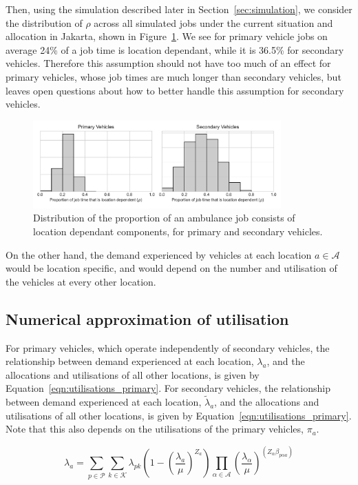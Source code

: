 \documentclass[preprint,12pt]{elsarticle}
\begin{document}
Then, using the simulation described later in Section~\ref{sec:simulation}, we
consider the distribution of $\rho$ across all simulated jobs under the current
situation and allocation in Jakarta, shown in Figure~\ref{fig:rho_distribution}.
We see for primary vehicle jobs on average 24\% of a job time is location
dependant, while it is 36.5\% for secondary vehicles. Therefore this assumption
should not have too much of an effect for primary vehicles, whose job times are
much longer than secondary vehicles, but leaves open questions about how to
better handle this assumption for secondary vehicles.

\begin{figure}
    \centering
    \includegraphics[width=0.85\textwidth]{img/location_dependant_service_time_proportion}
    \caption{Distribution of the proportion of an ambulance job consists of
    location dependant components, for primary and secondary vehicles.}
    \label{fig:rho_distribution}
\end{figure}

On the other hand, the demand experienced by vehicles at each location
$a \in \mathcal{A}$ would be location specific, and would depend on the number
and utilisation of the vehicles at every other location.


\subsection{Numerical approximation of utilisation}
For primary vehicles, which operate independently of secondary vehicles, the
relationship between demand experienced at each location, $\lambda_a$, and the
allocations and utilisations of all other locations, is given by
Equation~\ref{eqn:utilisations_primary}. For secondary vehicles, the
relationship between demand experienced at each location, $\tilde{\lambda}_a$,
and the allocations and utilisations of all other locations, is given by
Equation~\ref{eqn:utilisations_primary}. Note that this also depends on the
utilisations of the primary vehicles, $\pi_a$.

\begin{equation}\label{eqn:utilisations_primary}
\lambda_a = \sum_{p \in \mathcal{P}} \sum_{k \in \mathcal{K}} \lambda_{pk}
\left( 1 - \left(\frac{\lambda_a}{\mu}\right)^{Z_a} \right)
\prod_{\alpha \in \mathcal{A}} \left(\frac{\lambda_{\alpha}}{\mu}\right)^{
\left(Z_{\alpha} \beta_{p \alpha a}\right)}
\end{equation}
\end{document}
